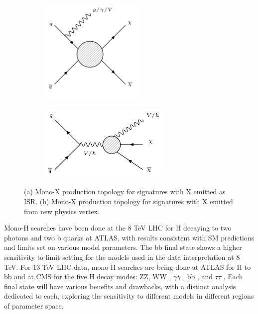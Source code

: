 \begin{figure}[tbh]
\centering
\begin{subfigure}{0.45\textwidth}
\centering
\includegraphics[width=2in]{figures/isr.png}
\caption{}
\label{fig:isr}
\end{subfigure}
\begin{subfigure}{0.45\textwidth}
\centering
\includegraphics[width=2.5in]{figures/fsr.png}
\caption{}
\label{fig:fsr}
\end{subfigure}
\caption{(a) Mono-X production topology for signatures with X emitted as ISR. (b) Mono-X production topology for signatures with X emitted from new physics vertex.}
\label{monox}
\end{figure}

Mono-H searches have been done at the 8 TeV LHC for H decaying to two photons \cite{Aad:2015yga} and two b quarks \cite{Aad:2015dva} at ATLAS, with results consistent with SM predictions and limits set on various model parameters. The bb final state shows a higher sensitivity to limit setting for the models used in the data interpretation at 8 TeV. For 13 TeV LHC data, mono-H searches are being done at ATLAS for H to bb \cite{Atlas:2016Hbb} and at CMS for the five H decay modes: ZZ, WW \cite{CMS-AN-15-338}, $\gamma\gamma$ \cite{CMS-AN-15-203}, bb \cite{CMS-AN-15-209}, and $\tau\tau$ \cite{CMS-AN-15-???}. Each final state will have various benefits and drawbacks, with a distinct analysis dedicated to each, exploring the sensitivity to different models in different regions of parameter space.

